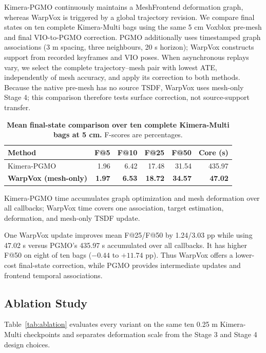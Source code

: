 Kimera-PGMO continuously maintains a MeshFrontend deformation graph, whereas
WarpVox is triggered by a global trajectory revision. We compare final states
on ten complete Kimera-Multi bags using the same 5 cm Voxblox pre-mesh and
final VIO-to-PGMO correction. PGMO additionally uses timestamped graph
associations (3 m spacing, three neighbours, 20 s horizon); WarpVox constructs
support from recorded keyframes and VIO poses. When asynchronous replays vary,
we select the complete trajectory--mesh pair with lowest ATE, independently of
mesh accuracy, and apply its correction to both methods. Because the native
pre-mesh has no source TSDF, WarpVox uses mesh-only Stage 4; this comparison
therefore tests surface correction, not source-support transfer.

\begin{table}[t]
\centering
\caption{\textbf{Mean final-state comparison over ten complete Kimera-Multi
bags at 5 cm.} F-scores are percentages.}
\label{tab:pgmo_full10}
\scriptsize
\setlength{\tabcolsep}{2.2pt}
\begin{tabular}{lrrrrr}
\toprule
Method & F@5 & F@10 & F@25 & F@50 & Core (s) \\
\midrule
Kimera-PGMO & 1.96 & 6.42 & 17.48 & 31.54 & 435.97 \\
\textbf{WarpVox (mesh-only)} & \textbf{1.97} & \textbf{6.53} &
\textbf{18.72} & \textbf{34.57} & \textbf{47.02} \\
\bottomrule
\end{tabular}
\vspace{1pt}

\parbox{\columnwidth}{\scriptsize Kimera-PGMO time accumulates graph
optimization and mesh deformation over all callbacks; WarpVox time covers one
association, target estimation, deformation, and mesh-only TSDF update.}
\end{table}

One WarpVox update improves mean F@25/F@50 by 1.24/3.03 pp while using
47.02 s versus PGMO's 435.97 s accumulated over all callbacks. It has higher
F@50 on eight of ten bags ($-0.44$ to $+11.74$ pp). Thus WarpVox offers a
lower-cost final-state correction, while PGMO provides intermediate updates and
frontend temporal associations.

\subsection{Ablation Study}

Table~\ref{tab:ablation} evaluates every variant on the same ten 0.25 m
Kimera-Multi checkpoints and separates deformation scale from the Stage 3 and
Stage 4 design choices.

